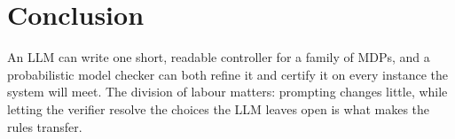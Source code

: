 \section{Conclusion}\label{sec:conclusion}

An LLM can write one short, readable controller for a family of MDPs, and a probabilistic model checker can both
refine it and certify it on every instance the system will meet. The division of labour matters: prompting changes
little, while letting the verifier resolve the choices the LLM leaves open is what makes the rules transfer.
